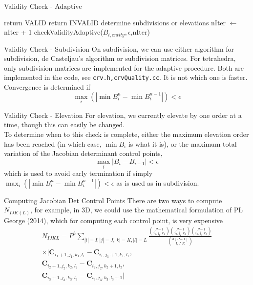 \documentclass[12pt]{beamer}
\begin{document}
\begin{frame}{Validity Check - Adaptive}\scriptsize
\begin{algorithmic}[1]
\State return VALID
\State return INVALID
\Else
\State determine subdivisions or elevations
  \State nIter $\gets$ nIter + 1
  \State checkValidityAdaptive($B_{i,entity},\epsilon$,nIter)
  \EndFor
\EndIf

\EndFunction
\end{algorithmic}
\end{frame}
\begin{frame}{Validity Check - Subdivision}
On subdivision, we can use either algorithm for subdivision, de Casteljau's algorithm or subdivision matrices. For tetrahedra, only subdivision matrices are implemented for the adaptive procedure. Both are implemented in the code, see \texttt{crv.h,crvQuality.cc}. It is not which one is faster. Convergence is determined if
\[
\max_i(|\min B_i^n - \min B_i^{n-1}|) < \epsilon
\]
\end{frame}
\begin{frame}{Validity Check - Elevation}
For elevation, we currently elevate by one order at a time, though this can easily be changed. \\

To determine when to this check is complete, either the maximum elevation order has been reached (in which case, $\min B_i$ is what it is), or the maximum total variation of the Jacobian determinant control points,
\[
\max_i |B_{i}-B_{i-1}| < \epsilon
\]
which is used to avoid early termination if simply $\max_i(|\min B_i^n - \min B_i^{n-1}|) < \epsilon$  as is used as in subdivision.
\end{frame}
\begin{frame}{Computing Jacobian Det Control Points}
There are two ways to compute $N_{IJK(L)}$, for example, in 3D, 
we could use the mathematical formulation of PL George (2014), which for computing each control point, is very expensive
{
  \footnotesize
\begin{eqnarray*}
N_{IJKL} = P^3 \displaystyle\sum_{|i|=I,|j|=J,|k|=K,|l|=L} \frac{{P-1 \choose i_1,j_1,k_1}{P-1 \choose i_2,j_2,k_2}{P-1 \choose i_3,j_3,k_3}}{ {3(P-1) \choose I,J,K}} \\  \times|\mathbf{C}_{i_1+1,j_1,k_1,l_1}-\mathbf{C}_{i_1,j_1+1,k_1,l_1},\\\mathbf{C}_{i_2+1,j_2,k_2,l_2}-\mathbf{C}_{i_2,j_2,k_2+1,l_2},\\
\mathbf{C}_{i_3+1,j_3,k_3,l_3}-\mathbf{C}_{i_3,j_3,k_3,l_3+1}|
\end{eqnarray*}
}

\end{frame}
\end{document}
